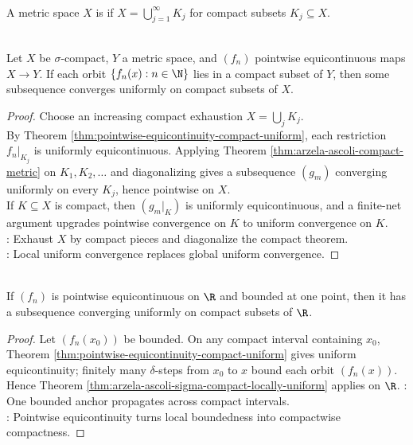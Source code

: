 \begin{definition} \label{def:sigma-compact-metric-space} \\
A metric space $X$ is  if $X=\bigcup\limits_{j=1}^{\infty}K_j$ for compact subsets $K_j\subseteq X$.
\end{definition}

\begin{theorem} \label{thm:arzela-ascoli-sigma-compact-locally-uniform} \\
Let $X$ be $\sigma$-compact, $Y$ a metric space, and $(f_n)$ pointwise equicontinuous maps $X\to Y$. If each orbit $\{f_n(x):n\in\N\}$ lies in a compact subset of $Y$, then some subsequence converges uniformly on compact subsets of $X$.
\begin{proof}
Choose an increasing compact exhaustion $X=\bigcup_jK_j$.\\
By Theorem \ref{thm:pointwise-equicontinuity-compact-uniform}, each restriction $f_n|_{K_j}$ is uniformly equicontinuous. Applying Theorem \ref{thm:arzela-ascoli-compact-metric} on $K_1,K_2,\ldots$ and diagonalizing gives a subsequence $(g_m)$ converging uniformly on every $K_j$, hence pointwise on $X$.\\
If $K\subseteq X$ is compact, then $(g_m|_K)$ is uniformly equicontinuous, and a finite-net argument upgrades pointwise convergence on $K$ to uniform convergence on $K$.\\
: Exhaust $X$ by compact pieces and diagonalize the compact theorem.\\
: Local uniform convergence replaces global uniform convergence.
\end{proof}
\end{theorem}

\begin{corollary} \label{cor:arzela-ascoli-real-line-locally-uniform} \\
If $(f_n)$ is pointwise equicontinuous on $\R$ and bounded at one point, then it has a subsequence converging uniformly on compact subsets of $\R$.
\begin{proof}
Let $(f_n(x_0))$ be bounded. On any compact interval containing $x_0$, Theorem \ref{thm:pointwise-equicontinuity-compact-uniform} gives uniform equicontinuity; finitely many $\delta$-steps from $x_0$ to $x$ bound each orbit $(f_n(x))$. Hence Theorem \ref{thm:arzela-ascoli-sigma-compact-locally-uniform} applies on $\R$.
: One bounded anchor propagates across compact intervals.\\
: Pointwise equicontinuity turns local boundedness into compactwise compactness.
\end{proof}
\end{corollary}

